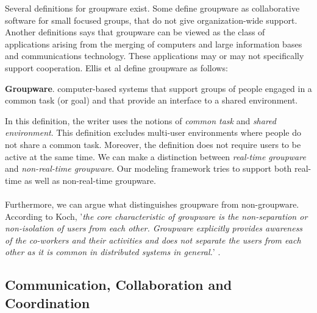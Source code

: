 Several definitions for groupware exist. Some define groupware as collaborative software for small focused groups, that do not give organization-wide support. Another definitions says that groupware can be viewed as the class of applications arising from the merging of computers and large information bases and communications technology. These applications may or may not specifically support cooperation. Ellis et al define groupware as follows:
\begin{mydef}
\textbf{Groupware}. computer-based systems that support groups of people engaged in a common task (or goal) and that provide an interface to a shared environment. \cite{CSCWGroupware}
\end{mydef}
In this definition, the writer uses the notions of \textit{common task} and \textit{shared environment}. This definition excludes multi-user environments where people do not share a common task. Moreover, the definition does not require users to be active at the same time. We can make a distinction between \textit{real-time groupware} and \textit{non-real-time groupware}. Our modeling framework tries to support both real-time as well as non-real-time groupware.
\\ \\
Furthermore, we can argue what distinguishes groupware from non-groupware. According to Koch, '\textit{the core characteristic of groupware is the non-separation or non-isolation of users from each other. Groupware explicitly provides awareness of the co-workers and their activities and does not separate the users from each other as it is common in distributed systems in general.}' \cite{CSCWConcepts}.

\subsection{Communication, Collaboration and Coordination}

